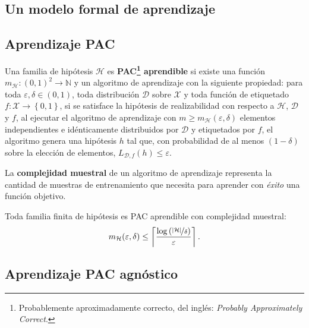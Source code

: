 \documentclass[8pt,a4paper]{extarticle}
\begin{document}
\begin{multicols}{3}
	\newpage

	\section{Un modelo formal de aprendizaje}

	\subsection{Aprendizaje PAC}

	\begin{boxdef}
		Una familia de hipótesis $\mathcal{H}$ es \textbf{PAC\footnote{Probablemente aproximadamente correcto, del inglés: \emph{Probably Approximately Correct}.} aprendible} si existe una función $m_{\mathcal{H}} : (0,1)^2 \to \mathbb{N}$ y un algoritmo de aprendizaje con la siguiente propiedad: \textcolor{dred}{para toda $\varepsilon, \delta \in (0,1)$, toda distribución $\mathcal{D}$ sobre $ \mathcal{X}$ y toda función de etiquetado $f : \mathcal{X} \to \left\{ 0,1 \right\} $, si se satisface la hipótesis de realizabilidad con respecto a $\mathcal{H}$, $\mathcal{D}$ y $f$, al ejecutar el algoritmo de aprendizaje con  $m \ge m_{\mathcal{H}} (\varepsilon, \delta)$ elementos independientes e idénticamente distribuidos por $\mathcal{D}$ y etiquetados por $f$, el algoritmo genera una hipótesis  $h$ tal que, con probabilidad de al menos  $(1 - \delta)$ sobre la elección de elementos,  $L_{\mathcal{D}, f} (h) \le \varepsilon$.}
	\end{boxdef}

	\begin{boxdef}
		La \textbf{complejidad muestral} de un algoritmo de aprendizaje representa la cantidad de muestras de entrenamiento que necesita para aprender con \emph{éxito} una función objetivo.
	\end{boxdef}

	\begin{boxcor}[]
		Toda familia finita de hipótesis es PAC aprendible con complejidad muestral:
		\[
			m_{\mathcal{H}}(\varepsilon, \delta) \le \left\lceil \frac{\log \left( \nicefrac{\left| \mathcal{H} \right| }{\delta} \right) }{\varepsilon} \right\rceil
			.\]
	\end{boxcor}

	\subsection{Aprendizaje PAC agnóstico}


\end{multicols}
\end{document}
